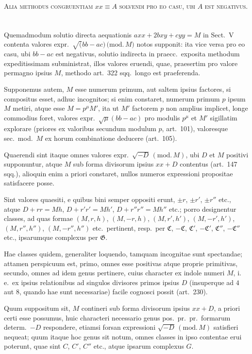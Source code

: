\documentclass[12pt,a4paper]{article}
\theoremstyle{plain}
\theoremstyle{definition}
\theoremstyle{remark}
\begin{document}
\bigskip
\noindent\textsc{Alia methodus congruentiam} $xx\equiv A$ \textsc{solvendi pro eo casu, ubi} $A$ \textsc{est negativus.}

\section{}

Quemadmodum solutio directa aequationis $axx+2bxy+cyy=M$ in Sect.\ V contenta valores expr.~$\surd(bb-ac)\,\mathrm{(mod.}\,M)$ notos supponit: ita vice versa pro eo casu, ubi $bb-ac$ est negativus, solutio indirecta in praecc.\ exposita methodum expeditissimam subministrat, illos valores eruendi, quae, praesertim pro valore permagno ipsius $M$, methodo art.\ 322 sqq.\ longo est praeferenda.

Supponemus autem, $M$ esse numerum primum, aut saltem ipsius factores, si compositus esset, adhuc incognitos; si enim constaret, numerum primum $p$ ipsum $M$ metiri, atque esse $M=p^\mu M'$, ita ut $M'$ factorem $p$ non amplius implicet, longe commodius foret, valores expr.~$\surd\mu(bb-ac)$ pro modulis $p^\mu$ et $M'$ sigillatim explorare (priores ex valoribus secundum modulum $p$, art.\ 101), valoresque sec.\ mod.\ $M$ ex horum combinatione deducere (art.\ 105).

Quaerendi sint itaque omnes valores expr.~$\surd{-D}\,(\mathrm{mod.}\,M)$, ubi $D$ et $M$ positivi supponuntur, atque $M$ sub forma divisorum ipsius $xx+D$ contentus (art.\ 147 sqq.), alioquin enim a priori constaret, nullos numeros expressioni propositae satisfacere posse.

Sint valores quaesiti, e quibus bini semper oppositi erunt, $\pm r$, $\pm r'$, $\pm r''$ etc., atque $D+rr=Mh$, $D+r'r'=Mh'$, $D+r''r''=Mh''$ etc.; porro designentur classes, ad quas formae $(M,r,h)$, $(M,-r,h)$, $(M,r',h')$, $(M,-r',h')$, $(M,r'',h'')$, $(M,-r'',h'')$ etc.\ pertinent, resp.\ per $\mathfrak{C}$, $-\mathfrak{C}$, $\mathfrak{C}'$, $-\mathfrak{C}'$, $\mathfrak{C}''$, $-\mathfrak{C}''$ etc., ipsarumque complexus per $\mathfrak{G}$.

Hae classes quidem, generaliter loquendo, tamquam incognitae sunt spectandae; attamen perspicuum est, primo, omnes esse positivas atque proprie primitivas, secundo, omnes ad idem genus pertinere, cuius character ex indole numeri $M$, i.\,e.\ ex ipsius relationibus ad singulos divisores primos ipsius $D$ (insuperque ad $4$ aut $8$, quando hae sunt necessariae) facile cognosci possit (art.\ 230).

Quum suppositum sit, $M$ contineri sub forma divisorum ipsius $xx+D$, a priori certi esse possumus, huic characteri necessario genus pos.\ pr.\ pr.\ formarum determ.\ $-D$ respondere, etiamsi forsan expressioni $\surd{-D}\,(\mathrm{mod.}\,M)$ satisfieri nequeat; quum itaque hoc genus sit notum, omnes classes in ipso contentae erui poterunt, quae sint $C$, $C'$, $C''$ etc., atque ipsarum complexus $G$.
\end{document}
